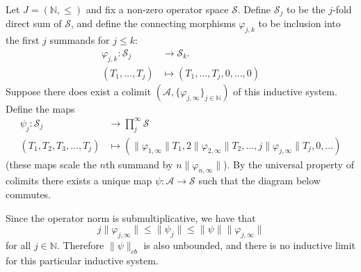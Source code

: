 \documentclass[12pt]{article}
\theoremstyle{definition}
\newenvironment{example}
  {\pushQED{\qed}\renewcommand{\qedsymbol}{\textcircled{\tiny E}}\examplex}
  {\popQED\endexamplex}
\newcommand{\N}{\mathbb N}
\newcommand{\mc}[1]{\mathcal{#1}}
\newcommand{\<}{\langle}
\renewcommand{\>}{\rangle}
\begin{document}
\begin{example} \label{ex: ccmap}
    Let $J = (\N,\leq)$ and fix a non-zero operator space $\mc S$. Define $\mc S_j$ to be the $j$-fold direct sum of $\mc S$, and define the connecting morphisms $\varphi_{j,k}$ to be inclusion into the first $j$ summands for $j \leq k$:
    \begin{align*}
    \varphi_{j,k} : \mc S_j &\to \mc S_k. \\
    (T_1, \ldots , T_j) &\mapsto (T_1, \ldots , T_j, 0,...,0)
    \end{align*}
    Suppose there does exist a colimit $(\mc A, \{\varphi_{j,\infty}\}_{j \in \N})$ of this inductive system. Define the maps
    \begin{align*}
        \psi_j : \mc S_j &\to \prod^\infty_{j} \mc S \\
        (T_1, T_2, T_3,...,T_j) &\mapsto (\|\varphi_{1,\infty}\|T_1, 2\|\varphi_{2,\infty}\|T_2, ...,j\|\varphi_{j,\infty}\|T_j, 0,...)
    \end{align*}
    (these maps scale the $n$th summand by $n\|\varphi_{n,\infty}\|$). By the universal property of colimits there exists a unique map $\psi: \mc A \to \mc S$ such that the diagram below commutes.
    \begin{center}
    \end{center}    
    Since the operator norm is submultiplicative, we have that 
    \[
    j\|\varphi_{j,\infty}\| \leq \|\psi_j\| \leq \|\psi\|\|\varphi_{j,\infty}\| 
    \]
    for all $j \in \N$. Therefore $\|\psi\|_{cb}$ is also unbounded, and there is no inductive limit for this particular inductive system.
\end{example}
\end{document}
